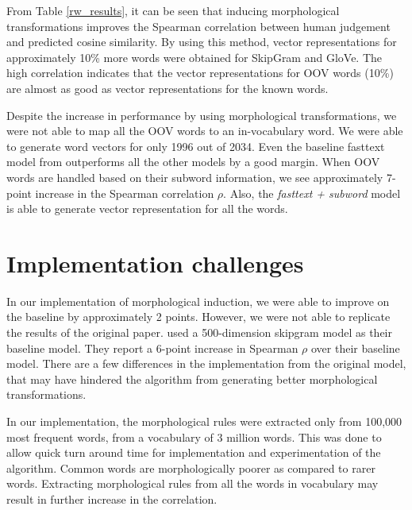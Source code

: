 From Table \ref{rw_results}, it can be seen that inducing morphological transformations improves the Spearman correlation between human judgement and predicted cosine similarity. By using this method, vector representations for approximately 10\% more words were obtained for SkipGram and GloVe. The high correlation indicates that the vector representations for OOV words (10\%) are almost as good as vector representations for the known words. 



Despite the increase in performance by using morphological transformations, we were not able to map all the OOV words to an in-vocabulary word. We were able to generate word vectors for only 1996 out of 2034. Even the baseline fasttext model from \cite{bojanowski2016enriching} outperforms all the other models by a good margin. When OOV words are handled based on their subword information, we see approximately 7-point increase in the Spearman correlation $\rho$. Also, the \textit{fasttext + subword} model is able to generate vector representation for all the words.  


\section{Implementation challenges}
In our implementation of morphological induction, we were able to improve on the baseline by approximately 2 points. However, we were not able to replicate the results of the original paper. \citeauthor{soricut2015unsupervised} used a  500-dimension skipgram model as their baseline model. They report a 6-point increase in Spearman $\rho$ over their baseline model.  There are a few differences in the implementation from the original model, that may have hindered the algorithm from generating better morphological transformations.

In our implementation, the morphological rules were extracted only from 100,000 most frequent words, from a vocabulary of 3 million words. This was done to allow quick turn around time for implementation and experimentation of the algorithm. Common words are morphologically poorer as compared to rarer words. Extracting morphological rules from all the words in vocabulary may result in further increase in the correlation.

